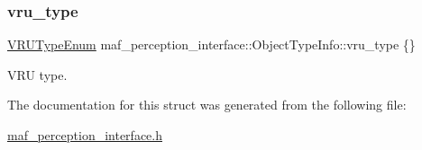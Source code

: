 \subsubsection{\texorpdfstring{vru\+\_\+type}{vru\_type}}
{\footnotesize\ttfamily \hyperlink{structmaf__perception__interface_1_1VRUTypeEnum}{V\+R\+U\+Type\+Enum} maf\+\_\+perception\+\_\+interface\+::\+Object\+Type\+Info\+::vru\+\_\+type \{\}}



V\+RU type. 



The documentation for this struct was generated from the following file\+:\begin{DoxyCompactItemize}
\item 
\hyperlink{maf__perception__interface_8h}{maf\+\_\+perception\+\_\+interface.\+h}\end{DoxyCompactItemize}

